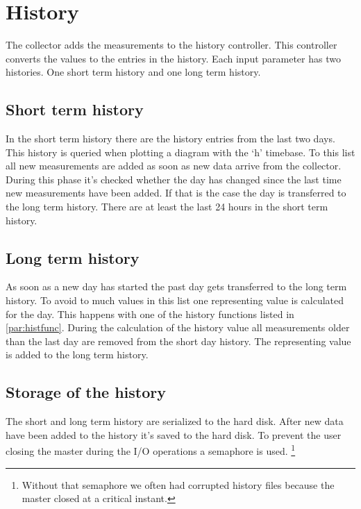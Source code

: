{\C  }


\section{History} %
\label{sec:history}
The collector adds the measurements to the history controller. This controller converts the values to the entries in the history. Each input parameter has two histories. One short term history and one long term history. 
\subsection{Short term history} %
\label{sub:short_term_history}
In the short term history there are the history entries from the last two days. This history is queried when plotting a diagram with the `h' timebase. To this list all new measurements are added as soon as new data arrive from the collector. During this phase it's checked whether the day has changed since the last time new measurements have been added. If that is the case the day is transferred to the long term history. There are at least the last 24 hours in the short term history.

\subsection{Long term history} %
\label{ssub:long_term_history}
As soon as a new day has started the past day gets transferred to the long term history. To avoid to much values in this list one representing value is calculated for the day. This happens with one of the history functions listed in \ref{par:histfunc}. During the calculation of the history value all measurements older than the last day are removed from the short day history. The representing value is added to the long term history.

\subsection{Storage of the history} %
\label{sub:storage_of_the_history}
The short and long term history are serialized to the hard disk. After new data have been added to the history it's saved to the hard disk. To prevent the user closing the master during the I/O operations a semaphore is used. \footnote{Without that semaphore we often had corrupted history files because the master closed at a critical instant.}

